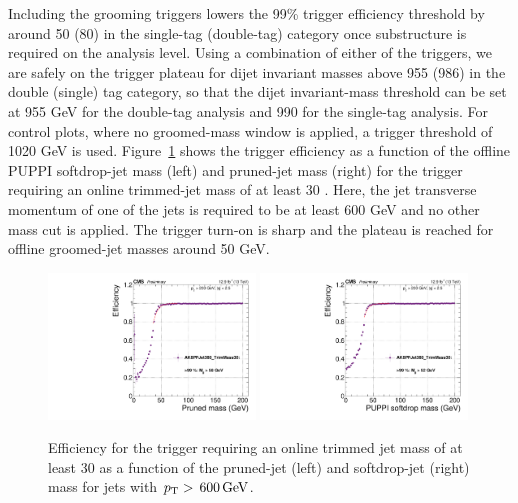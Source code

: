 \noindent Including the grooming triggers lowers the 99\% trigger efficiency threshold by around 50 (80) \GeV in the single-tag (double-tag) category once substructure is required on the analysis level. Using a combination of either of the triggers, we are safely on the trigger plateau for dijet invariant masses above 955 (986) \GeV in the double (single) tag category, so that the dijet invariant-mass threshold can be set at 955 GeV for the double-tag analysis and 990 \GeV for the single-tag analysis. For control plots, where no groomed-mass window is applied, a trigger threshold of 1020 GeV is used. Figure~\ref{fig:searchII:grooming-mj-trigger} shows the trigger efficiency as a function of the offline PUPPI softdrop-jet mass (left) and pruned-jet mass (right) for the trigger requiring an online trimmed-jet mass of at least 30 \GeV. Here, the jet transverse momentum of one of the jets is required to be at least 600 GeV and no other mass cut is applied. The trigger turn-on is sharp and the plateau is reached for offline groomed-jet masses around 50 GeV.
\begin{figure}[h!]
\centering
\includegraphics[width=0.49\textwidth]{figures/analysis/search2/AN-16-235/plots/triggereff-prunedmass_fit.pdf}
\includegraphics[width=0.49\textwidth]{figures/analysis/search2/AN-16-235/plots/triggereff-sdmass_fit.pdf}
\caption{Efficiency for the trigger requiring an online trimmed jet mass of at least 30 \GeV as a function of the pruned-jet (left) and softdrop-jet (right) mass for jets with $p_{\mathrm{T}} > \text{\,600}{\ensuremath{\,\text{Ge\hspace{-.08em}V}}}$.}
\label{fig:searchII:grooming-mj-trigger}
\end{figure}


